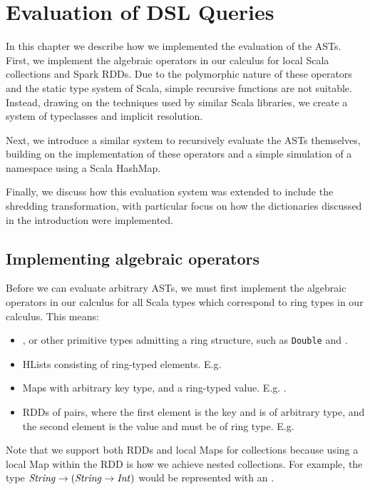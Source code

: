 \chapter{Evaluation of DSL Queries} \label{evaluation}

In this chapter we describe how we implemented the evaluation of the ASTs. First, we implement the algebraic operators in our calculus for local Scala collections and Spark RDDs. Due to the polymorphic nature of these operators and the static type system of Scala, simple recursive functions are not suitable. Instead, drawing on the techniques used by similar Scala libraries, we create a system of typeclasses and implicit resolution.

Next, we introduce a similar system to recursively evaluate the ASTs themselves, building on the implementation of these operators and a simple simulation of a namespace using a Scala HashMap. 

Finally, we discuss how this evaluation system was extended to include the shredding transformation, with particular focus on how the dictionaries discussed in the introduction were implemented.

\section{Implementing algebraic operators}

Before we can evaluate arbitrary ASTs, we must first implement the algebraic operators in our calculus for all Scala types which correspond to ring types in our calculus. This means:
\begin{itemize}
\item{, or other primitive types admitting a ring structure, such as \lstinline|Double| and .}
\item{HLists consisting of ring-typed elements. E.g. \vs {}} 
\item{Maps with arbitrary key type, and a ring-typed value.
E.g. .}
\item{RDDs of pairs, where the first element is the key and is of arbitrary type, and the second element is the value and must be of ring type. E.g. \lin{RDD[(String,Int::Boolean::HNil)}}
\end{itemize}

Note that we support both RDDs and local Maps for collections because using a local Map within the RDD is how we achieve nested collections. For example, the type $\textrm{\textit{String}} \rightarrow (\textrm{\textit{String}} \rightarrow \textrm{\textit{Int}})$ would be represented with an .

